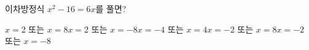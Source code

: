 이차방정식 $x^2-16=6x$를 풀면?
\begin{choicesii}{$x=2$ 또는 $x=8$}{$x=2$ 또는 $x=-8$}{$x=-4$ 또는 $x=4$}{$x=-2$ 또는 $x=8$}{$x=-2$ 또는 $x=-8$}\end{choicesii}
